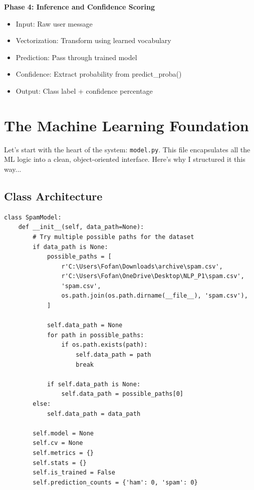 \documentclass[12pt, a4paper]{article}
\begin{document}
\textbf{Phase 4: Inference and Confidence Scoring}

\begin{itemize}
    \item Input: Raw user message
    \item Vectorization: Transform using learned vocabulary
    \item Prediction: Pass through trained model
    \item Confidence: Extract probability from predict\_proba()
    \item Output: Class label + confidence percentage
\end{itemize}

\section{The Machine Learning Foundation}

Let's start with the heart of the system: \texttt{model.py}. This file encapsulates all the ML logic into a clean, object-oriented interface. Here's why I structured it this way...

\subsection{Class Architecture}

\begin{verbatim}
class SpamModel:
    def __init__(self, data_path=None):
        # Try multiple possible paths for the dataset
        if data_path is None:
            possible_paths = [
                r'C:\Users\Fofan\Downloads\archive\spam.csv',
                r'C:\Users\Fofan\OneDrive\Desktop\NLP_P1\spam.csv',
                'spam.csv',
                os.path.join(os.path.dirname(__file__), 'spam.csv'),
            ]
            
            self.data_path = None
            for path in possible_paths:
                if os.path.exists(path):
                    self.data_path = path
                    break
            
            if self.data_path is None:
                self.data_path = possible_paths[0]
        else:
            self.data_path = data_path
            
        self.model = None
        self.cv = None
        self.metrics = {}
        self.stats = {}
        self.is_trained = False
        self.prediction_counts = {'ham': 0, 'spam': 0}
\end{verbatim}
\end{document}
